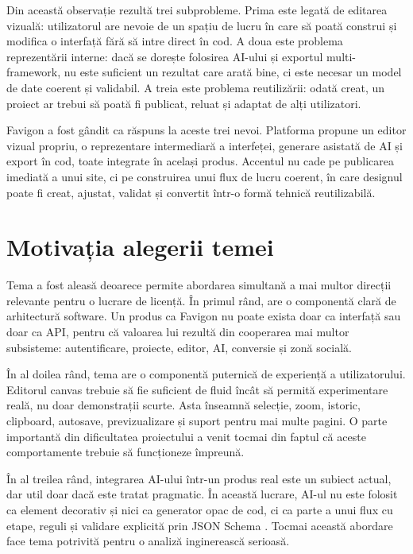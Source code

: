 Din această observație rezultă trei subprobleme. Prima este legată de editarea vizuală: utilizatorul are nevoie de un spațiu de lucru în care să poată construi și modifica o interfață fără să intre direct în cod. A doua este problema reprezentării interne: dacă se dorește folosirea AI-ului și exportul multi-framework, nu este suficient un rezultat care arată bine, ci este necesar un model de date coerent și validabil. A treia este problema reutilizării: odată creat, un proiect ar trebui să poată fi publicat, reluat și adaptat de alți utilizatori.

Favigon a fost gândit ca răspuns la aceste trei nevoi. Platforma propune un editor vizual propriu, o reprezentare intermediară a interfeței, generare asistată de AI și export în cod, toate integrate în același produs. Accentul nu cade pe publicarea imediată a unui site, ci pe construirea unui flux de lucru coerent, în care designul poate fi creat, ajustat, validat și convertit într-o formă tehnică reutilizabilă.

\section{Motivația alegerii temei}

Tema a fost aleasă deoarece permite abordarea simultană a mai multor direcții relevante pentru o lucrare de licență. În primul rând, are o componentă clară de arhitectură software. Un produs ca Favigon nu poate exista doar ca interfață sau doar ca API, pentru că valoarea lui rezultă din cooperarea mai multor subsisteme: autentificare, proiecte, editor, AI, conversie și zonă socială.

În al doilea rând, tema are o componentă puternică de experiență a utilizatorului. Editorul canvas trebuie să fie suficient de fluid încât să permită experimentare reală, nu doar demonstrații scurte. Asta înseamnă selecție, zoom, istoric, clipboard, autosave, previzualizare și suport pentru mai multe pagini. O parte importantă din dificultatea proiectului a venit tocmai din faptul că aceste comportamente trebuie să funcționeze împreună.

În al treilea rând, integrarea AI-ului într-un produs real este un subiect actual, dar util doar dacă este tratat pragmatic. În această lucrare, AI-ul nu este folosit ca element decorativ și nici ca generator opac de cod, ci ca parte a unui flux cu etape, reguli și validare explicită prin JSON Schema \cite{jsonSchemaCore2022,jsonSchemaValidation2022,openaiStructuredOutputs2026}. Tocmai această abordare face tema potrivită pentru o analiză inginerească serioasă.

